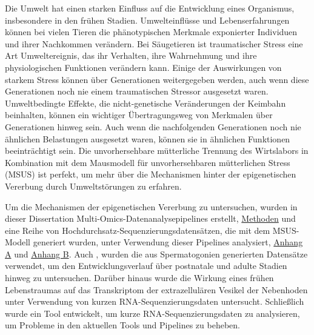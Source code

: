 \documentclass[12pt,twoside]{reedthesis}
\begin{document}
Die Umwelt hat einen starken Einfluss auf die Entwicklung eines Organismus, insbesondere in den frühen Stadien. Umwelteinflüsse und Lebenserfahrungen können bei vielen Tieren die phänotypischen Merkmale exponierter Individuen und ihrer Nachkommen verändern. Bei Säugetieren ist traumatischer Stress eine Art Umweltereignis, das ihr Verhalten, ihre Wahrnehmung und ihre physiologischen Funktionen verändern kann. Einige der Auswirkungen von starkem Stress können über Generationen weitergegeben werden, auch wenn diese Generationen noch nie einem traumatischen Stressor ausgesetzt waren. Umweltbedingte Effekte, die nicht-genetische Veränderungen der Keimbahn beinhalten, können ein wichtiger Übertragungsweg von Merkmalen über Generationen hinweg sein. Auch wenn die nachfolgenden Generationen noch nie ähnlichen Belastungen ausgesetzt waren, können sie in ähnlichen Funktionen beeinträchtigt sein. Die unvorhersehbare mütterliche Trennung des Wirtslabors in Kombination mit dem Mausmodell für unvorhersehbaren mütterlichen Stress (MSUS) ist perfekt, um mehr über die Mechanismen hinter der epigenetischen Vererbung durch Umweltstörungen zu erfahren.

Um die Mechanismen der epigenetischen Vererbung zu untersuchen, wurden in dieser Dissertation Multi-Omics-Datenanalysepipelines erstellt, \protect\hyperlink{methods}{Methoden} und eine Reihe von Hochdurchsatz-Sequenzierungsdatensätzen, die mit dem MSUS-Modell generiert wurden, unter Verwendung dieser Pipelines analysiert, \protect\hyperlink{aa}{Anhang A} und \protect\hyperlink{ab}{Anhang B}. Auch , wurden die aus Spermatogonien generierten Datensätze verwendet, um den Entwicklungsverlauf über postnatale und adulte Stadien hinweg zu untersuchen. Darüber hinaus wurde die Wirkung eines frühen Lebenstraumas auf das Transkriptom der extrazellulären Vesikel der Nebenhoden unter Verwendung von kurzen RNA-Sequenzierungsdaten untersucht. Schließlich wurde ein Tool entwickelt, um kurze RNA-Sequenzierungsdaten zu analysieren, um Probleme in den aktuellen Tools und Pipelines zu beheben.
\end{document}
